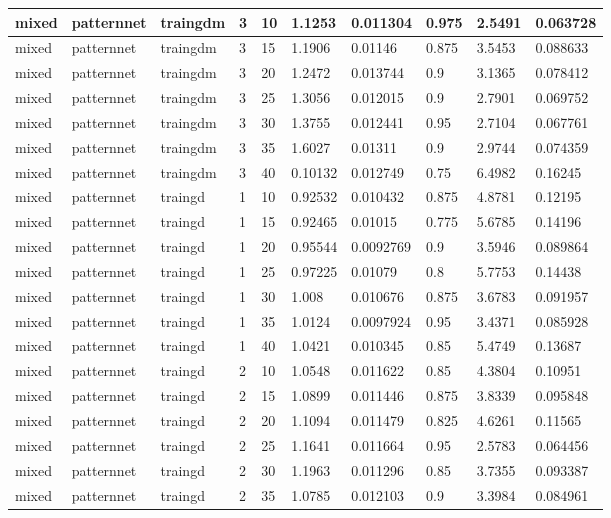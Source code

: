 \begin{longtable}{lllllllll}
mixed & patternnet & traingdm & 3 & 10 & 1.1253 & 0.011304 & 0.975 & 2.5491 & 0.063728 \\ \hline 
mixed & patternnet & traingdm & 3 & 15 & 1.1906 & 0.01146 & 0.875 & 3.5453 & 0.088633 \\ \hline 
mixed & patternnet & traingdm & 3 & 20 & 1.2472 & 0.013744 & 0.9 & 3.1365 & 0.078412 \\ \hline 
mixed & patternnet & traingdm & 3 & 25 & 1.3056 & 0.012015 & 0.9 & 2.7901 & 0.069752 \\ \hline 
mixed & patternnet & traingdm & 3 & 30 & 1.3755 & 0.012441 & 0.95 & 2.7104 & 0.067761 \\ \hline 
mixed & patternnet & traingdm & 3 & 35 & 1.6027 & 0.01311 & 0.9 & 2.9744 & 0.074359 \\ \hline 
mixed & patternnet & traingdm & 3 & 40 & 0.10132 & 0.012749 & 0.75 & 6.4982 & 0.16245 \\ \hline 
mixed & patternnet & traingd & 1 & 10 & 0.92532 & 0.010432 & 0.875 & 4.8781 & 0.12195 \\ \hline 
mixed & patternnet & traingd & 1 & 15 & 0.92465 & 0.01015 & 0.775 & 5.6785 & 0.14196 \\ \hline 
mixed & patternnet & traingd & 1 & 20 & 0.95544 & 0.0092769 & 0.9 & 3.5946 & 0.089864 \\ \hline 
mixed & patternnet & traingd & 1 & 25 & 0.97225 & 0.01079 & 0.8 & 5.7753 & 0.14438 \\ \hline 
mixed & patternnet & traingd & 1 & 30 & 1.008 & 0.010676 & 0.875 & 3.6783 & 0.091957 \\ \hline 
mixed & patternnet & traingd & 1 & 35 & 1.0124 & 0.0097924 & 0.95 & 3.4371 & 0.085928 \\ \hline 
mixed & patternnet & traingd & 1 & 40 & 1.0421 & 0.010345 & 0.85 & 5.4749 & 0.13687 \\ \hline 
mixed & patternnet & traingd & 2 & 10 & 1.0548 & 0.011622 & 0.85 & 4.3804 & 0.10951 \\ \hline 
mixed & patternnet & traingd & 2 & 15 & 1.0899 & 0.011446 & 0.875 & 3.8339 & 0.095848 \\ \hline 
mixed & patternnet & traingd & 2 & 20 & 1.1094 & 0.011479 & 0.825 & 4.6261 & 0.11565 \\ \hline 
mixed & patternnet & traingd & 2 & 25 & 1.1641 & 0.011664 & 0.95 & 2.5783 & 0.064456 \\ \hline 
mixed & patternnet & traingd & 2 & 30 & 1.1963 & 0.011296 & 0.85 & 3.7355 & 0.093387 \\ \hline 
mixed & patternnet & traingd & 2 & 35 & 1.0785 & 0.012103 & 0.9 & 3.3984 & 0.084961 \\ \hline 

\end{longtable}
